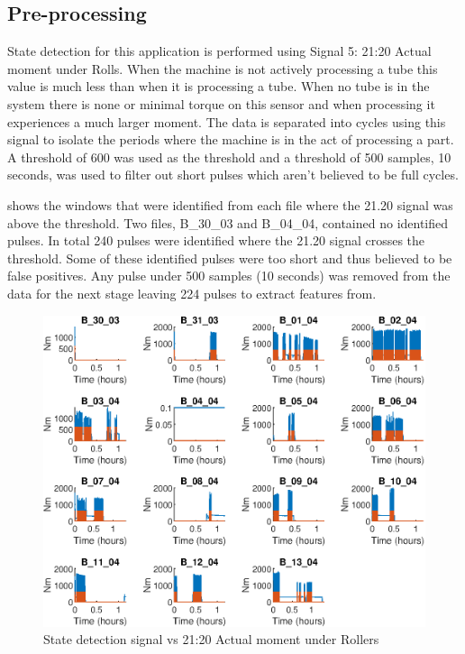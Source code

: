 \documentclass[]{article}
\begin{document}
\subsection{Pre-processing}
State detection for this application is performed using Signal 5: 21:20 Actual moment under Rolls. When the machine is not actively processing a tube this value is much less than when it is processing a tube. When no tube is in the system there is none or minimal torque on this sensor and when processing it experiences a much larger moment.
The data is separated into cycles using this signal to isolate the periods where the machine is in the act of processing a part. A threshold of 600 was used as the threshold and a threshold of 500 samples, 10 seconds, was used to filter out short pulses which aren't believed to be full cycles.

 shows the windows that were identified from each file where the 21.20 signal was above the threshold. Two files, B\_30\_03 and B\_04\_04, contained no identified pulses. In total 240 pulses were identified where the 21.20 signal crosses the threshold. Some of these identified pulses were too short and thus believed to be false positives. Any pulse under 500 samples (10 seconds) was removed from the data for the next stage leaving 224 pulses to extract features from.

\begin{figure}[H]
    \centering
    \includegraphics[width=\textwidth, height=\textheight, keepaspectratio]{figures/StateDetectionFig.eps}
    \caption{State detection signal vs 21:20 Actual moment under Rollers}
    \label{fig:StateDetection}
\end{figure}
\end{document}
